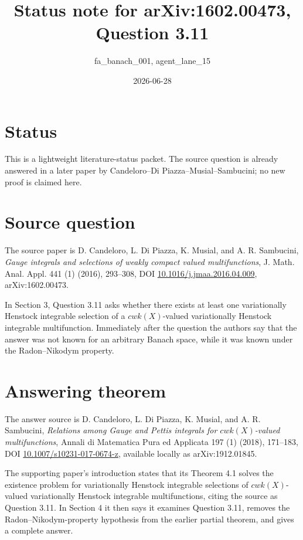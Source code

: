 \documentclass[11pt]{article}
\title{Status note for arXiv:1602.00473, Question 3.11}
\author{fa\_banach\_001, agent\_lane\_15}
\date{2026-06-28}
\begin{document}
\maketitle

\section*{Status}

This is a lightweight literature-status packet.  The source question is
already answered in a later paper by Candeloro--Di Piazza--Musial--Sambucini;
no new proof is claimed here.

\section*{Source question}

The source paper is D. Candeloro, L. Di Piazza, K. Musial, and
A. R. Sambucini, \emph{Gauge integrals and selections of weakly compact valued
multifunctions}, J. Math. Anal. Appl. 441 (1) (2016), 293--308, DOI
\href{https://doi.org/10.1016/j.jmaa.2016.04.009}{10.1016/j.jmaa.2016.04.009},
arXiv:1602.00473.

In Section 3, Question 3.11 asks whether there exists at least one
variationally Henstock integrable selection of a \(cwk(X)\)-valued
variationally Henstock integrable multifunction.
Immediately after the question the authors say that the answer was not known
for an arbitrary Banach space, while it was known under the Radon--Nikodym
property.

\section*{Answering theorem}

The answer source is D. Candeloro, L. Di Piazza, K. Musial, and
A. R. Sambucini, \emph{Relations among Gauge and Pettis integrals for
\(cwk(X)\)-valued multifunctions}, Annali di Matematica Pura ed Applicata
197 (1) (2018), 171--183, DOI
\href{https://doi.org/10.1007/s10231-017-0674-z}{10.1007/s10231-017-0674-z},
available locally as arXiv:1912.01845.

The supporting paper's introduction states that its Theorem 4.1 solves the
existence problem for variationally Henstock integrable selections of
\(cwk(X)\)-valued variationally Henstock integrable multifunctions, citing
the source as Question 3.11.  In Section 4 it then says it examines
Question 3.11, removes the Radon--Nikodym-property hypothesis from the earlier
partial theorem, and gives a complete answer.
\end{document}
